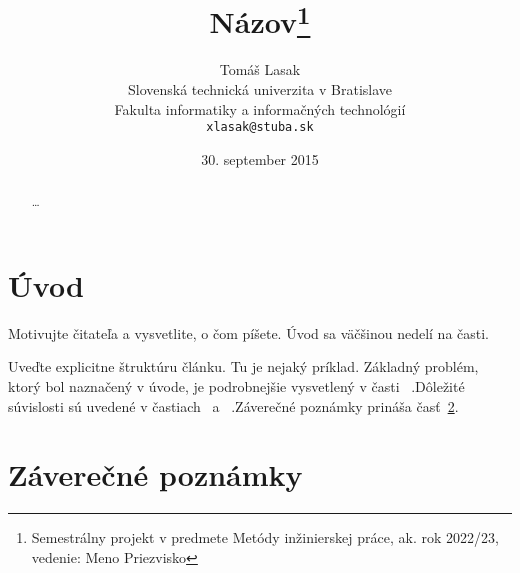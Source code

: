 \documentclass[10pt,twoside,slovak,a4paper]{coursepaper}
\title{Názov\thanks{Semestrálny projekt v predmete Metódy inžinierskej práce, ak. rok 2022/23, vedenie: Meno Priezvisko}} %
\author{Tomáš Lasak\\[2pt]
	{\small Slovenská technická univerzita v Bratislave}\\
	{\small Fakulta informatiky a informačných technológií}\\
	{\small \texttt{xlasak@stuba.sk}}
	}
\date{\small 30. september 2015} %
\begin{document}
\maketitle

\begin{abstract}
	\ldots
\end{abstract}

\section{Úvod}

Motivujte čitateľa a vysvetlite, o čom píšete. Úvod sa väčšinou nedelí na časti.

Uveďte explicitne štruktúru článku. Tu je nejaký príklad.
Základný problém, ktorý bol naznačený v úvode, je podrobnejšie vysvetlený v časti~
.Dôležité súvislosti sú uvedené v častiach~
 a~
.Záverečné poznámky prináša časť~\ref{zaver}.





\section{Záverečné poznámky} \label{zaver}





\end{document}
